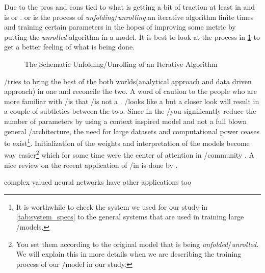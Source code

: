 Due to the pros and cons tied to \dl what is getting a bit of traction at least in \dsip and \cv is \du or \au. 
\du or \au is the process of \emph{unfolding}/\emph{unrolling} an iterative algorithm finite times and training certain parameters in 
the hopes of improving some metric by putting the \emph{unrolled} algorithm in a model. It is best to look at the process in \cref{fig:deep_unfolding_unrolling} 
to get a better feeling of what is being done. 
\begin{figure}
  \centering
	\captionsetup{justification=centering}
  \resizebox{35em}{10em}{}
  \caption{The Schematic Unfolding/Unrolling of an Iterative Algorithm}
  \label{fig:deep_unfolding_unrolling}
\end{figure}
\du/\au tries to bring the best of the both worlds(analytical approach and data driven approach) in one and reconcile the two. A word of 
caution to the people who are more familiar with \ml/\dl is that \du/\au is not a \rnn\cite{Gregor2010}. \DU/\AU looks like a \rnn\cite{Gregor2010} but 
a closer look will result in a couple of subtleties between the two. Since in the \du/\au you significantly reduce the number of 
parameters by using a context inspired model and not a full blown general \ml/\dl architecture, the need for large 
datasets and computational power ceases to exist\footnote{It is worthwhile to check the system we used for our 
study in \cref{tab:system_specs} to the general systems\cite{Meuer} that are used in training large \ml/\dl models.}. Initialization 
of the weights and interpretation of the models become way easier\footnote{You set them according to the original model that is being 
\emph{unfolded}/\emph{unrolled}. We will explain this in more details when we are describing the training process of our \ml/\dl model in our study.} which for some time were the center of attention in \ml/\dl community \cite{Glorot2010}\cite{He2015a}. A 
nice review on the recent application of \dl/\au in \dsip is done by \cite{Monga2019}.







complex valued neural networks have other applications too \cite{Bassey2021} \cite{Barrachina2023} \cite{CTOBYZDSSSJFSSMNRYBCP2017}


